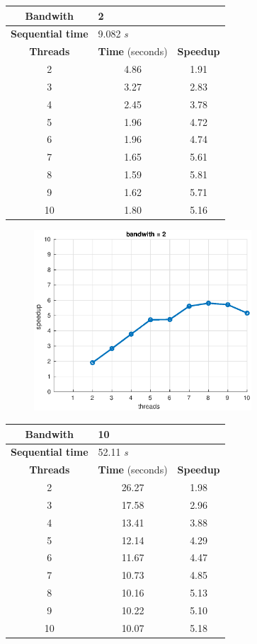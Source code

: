 \documentclass[10pt,twocolumn,letterpaper]{article}
\begin{document}
\begin{table}[H]
\centering
\begin{tabular}{ccc}
\hline
\textbf{Bandwith} & \multicolumn{2}{l}{2} \\ 
\hline
\textbf{Sequential time} & \multicolumn{2}{l}{9.082 \textit{s}} \\
\hline
\textbf{Threads} & \textbf{Time} (seconds) & \textbf{Speedup} \\
\hline
2 & 4.86  & 1.91 \\
3 & 3.27 & 2.83 \\
4 & 2.45 & 3.78 \\
5 & 1.96 & 4.72 \\
6 & 1.96 & 4.74 \\
7 & 1.65 & 5.61 \\
8 & 1.59 & 5.81 \\
9 & 1.62 & 5.71 \\
10 & 1.80 & 5.16 \\
\hline
\end{tabular}
\end{table}

\begin{figure}[H]
\centering
\includegraphics[width=3.2in]{fig/speedup2b.eps}
\end{figure}

\begin{table}[H]
\centering
\begin{tabular}{ccc}
\hline
\textbf{Bandwith} & \multicolumn{2}{l}{10} \\ 
\hline
\textbf{Sequential time} & \multicolumn{2}{l}{52.11 \textit{s}} \\
\hline
\textbf{Threads} & \textbf{Time} (seconds) & \textbf{Speedup} \\
\hline
2 & 26.27 & 1.98 \\
3 & 17.58 & 2.96 \\
4 & 13.41 & 3.88 \\
5 & 12.14 & 4.29 \\
6 & 11.67 & 4.47 \\
7 & 10.73 & 4.85 \\
8 & 10.16 & 5.13 \\
9 & 10.22 & 5.10 \\
10 & 10.07 & 5.18 \\
\hline
\end{tabular}
\end{table}
\end{document}
